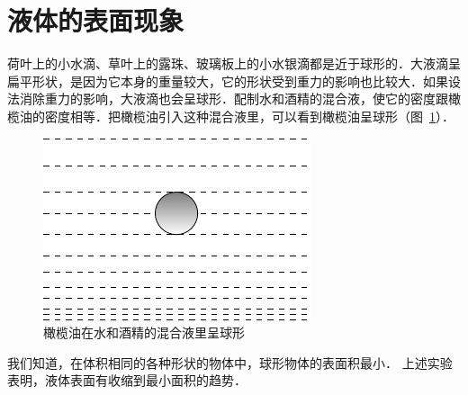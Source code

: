 \section{液体的表面现象}
荷叶上的小水滴、草叶上的露珠、玻璃板上的小水银滴都是近于球形的．大液滴呈扁平形状，是因为它本身的重量较大，它的形状受到重力的影响也比较大．如果设法消除重力的影响，大液滴也会呈球形．配制水和酒精的混合液，使它的密度跟橄榄油的密度相等．把橄榄油引入这种混合液里，可以看到橄榄油呈球形（图~\ref{fig_B_4-8}）．
\begin{figure}[htbp]
    \centering
    \includegraphics{fig/B/4-8.pdf}
    \caption{橄榄油在水和酒精的混合液里呈球形}\label{fig_B_4-8}
\end{figure}

我们知道，在体积相同的各种形状的物体中，球形物体的表面积最小．
上述实验表明，液体表面有收缩到最小面积的趋势．

